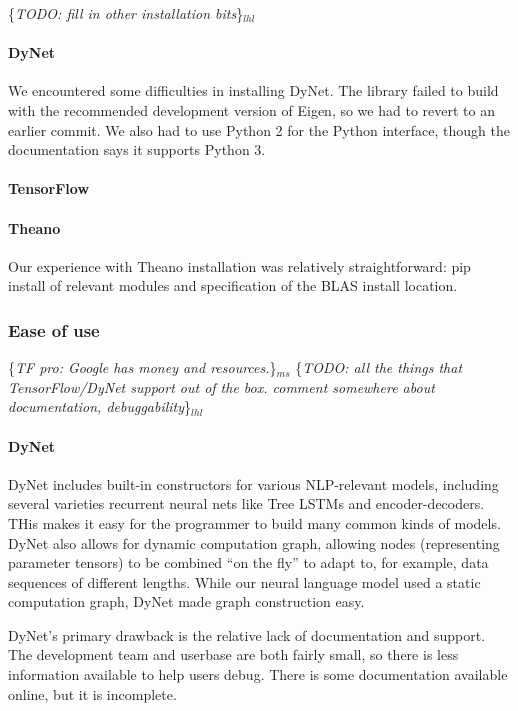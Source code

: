 \documentclass{article}
\newcommand{\ms}[1]{{\color{cyan}\{\textit{#1}\}$_{ms}$}}
\newcommand{\lhl}[1]{{\color{magenta}\{\textit{#1}\}$_{lhl}$}}
\begin{document}
\lhl{TODO: fill in other installation bits}

\paragraph{DyNet} We encountered some difficulties in installing DyNet. The library failed to build with the recommended development version of Eigen, so we had to revert to an earlier commit. We also had to use Python 2 for the Python interface, though the documentation says it supports Python 3.

\paragraph{TensorFlow}

\paragraph{Theano} Our experience with Theano installation was relatively straightforward: pip install of relevant modules and specification of the BLAS install location.

\subsubsection{Ease of use}
\ms{TF pro: Google has money and resources.}
\lhl{TODO: all the things that TensorFlow/DyNet support out of the box.
comment somewhere about documentation, debuggability}

\paragraph{DyNet}
DyNet includes built-in constructors for various NLP-relevant models, including several varieties recurrent neural nets like Tree LSTMs and encoder-decoders. THis makes it easy for the programmer to build many common kinds of models. DyNet also allows for dynamic computation graph, allowing nodes (representing parameter tensors) to be combined ``on the fly'' to adapt to, for example, data sequences of different lengths. While our neural language model used a static computation graph, DyNet made graph construction easy.

DyNet's primary drawback is the relative lack of documentation and support. The development team and userbase are both fairly small, so there is less information available to help users debug. There is some documentation available online, but it is incomplete.
\end{document}

